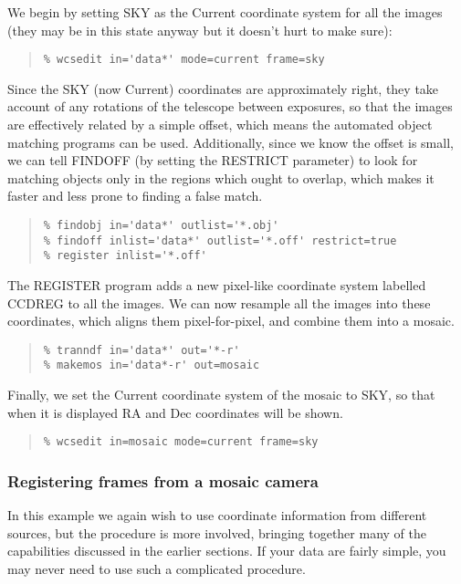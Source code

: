 \documentclass[twoside,11pt]{article}
\renewcommand{\_}{\texttt{\symbol{95}}}
\newenvironment{myquote}{\begin{quote}\begin{small}}{\end{small}\end{quote}}
\begin{document}
We begin by setting SKY as the Current coordinate system for all
the images (they may be in this state anyway
but it doesn't hurt to make sure):
\begin{myquote}
\begin{verbatim}
% wcsedit in='data*' mode=current frame=sky
\end{verbatim}
\end{myquote}
Since the SKY (now Current) coordinates are approximately right,
they take account of any rotations of the telescope between
exposures, so that the images are effectively related by a simple offset,
which means the automated object matching programs can be used.
Additionally, since we know the offset is small,
we can tell FINDOFF (by setting the RESTRICT parameter)
to look for matching objects
only in the regions which ought to overlap, which makes it faster
and less prone to finding a false match.
\begin{myquote}
\begin{verbatim}
% findobj in='data*' outlist='*.obj'
% findoff inlist='data*' outlist='*.off' restrict=true
% register inlist='*.off'
\end{verbatim}
\end{myquote}
The REGISTER program adds a new pixel-like coordinate system
labelled CCD\_REG to all the images.
We can now resample all the images into these coordinates, which 
aligns them pixel-for-pixel, and combine them into a mosaic.
\begin{myquote}
\begin{verbatim}
% tranndf in='data*' out='*-r'
% makemos in='data*-r' out=mosaic
\end{verbatim}
\end{myquote}
Finally, we set the Current coordinate system of the mosaic to SKY, so
that when it is displayed RA and Dec coordinates will be shown.
\begin{myquote}
\begin{verbatim}
% wcsedit in=mosaic mode=current frame=sky
\end{verbatim}
\end{myquote}


\subsubsection{\label{mosexnoset}Registering frames from a mosaic camera}

In this example we again wish to use coordinate information from
different sources, but the procedure is more involved, bringing 
together many of the capabilities discussed in the earlier sections.
If your data are fairly simple, you may never need to use such a 
complicated procedure.
\end{document}
